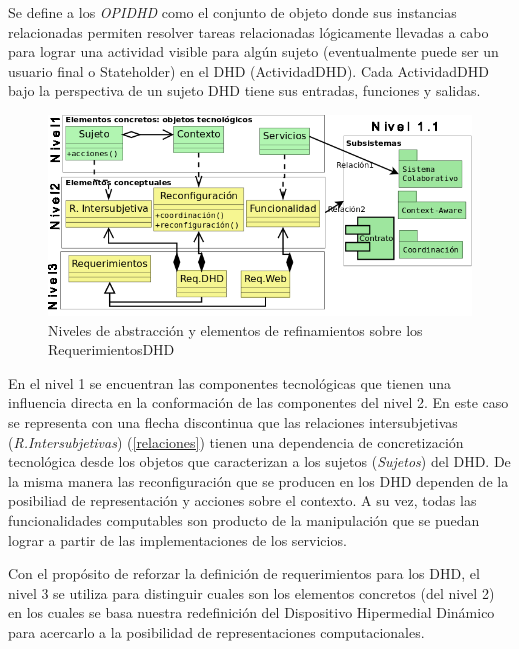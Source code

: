\begin{descrition}
\begin{definition}
\begin{defi} [OPIDHD] Se define a los \textit{OPIDHD} como el conjunto de objeto
donde sus instancias relacionadas permiten resolver tareas relacionadas
lógicamente llevadas a cabo para lograr una actividad visible para algún sujeto
(eventualmente puede ser un usuario final o Stateholder) en el
DHD (ActividadDHD). Cada ActividadDHD bajo la perspectiva de un sujeto DHD tiene
sus entradas, funciones y salidas.
\end{defi} \label{OPIDHD}



\begin{figure}
\begin{center}
 \includegraphics[width=5 in,totalheight=4 in] {DHD/RequerimientosDHD}
   \caption{Niveles de abstracción y elementos de refinamientos sobre
los RequerimientosDHD} \label{fig: RequerimientosDHD}
\end{center}
\end{figure}


En el nivel 1 se encuentran las componentes tecnológicas que tienen una
influencia directa en la conformación de las componentes del nivel 2. En este
caso se representa con una flecha discontinua que las relaciones intersubjetivas
(\textit{R.Intersubjetivas}) (\ref{relaciones}) tienen una  dependencia de
concretización tecnológica desde los objetos que caracterizan a los sujetos
(\textit{Sujetos}) del DHD. De la misma manera las reconfiguración
que se producen en los DHD dependen de la posibiliad de representación y
acciones sobre el contexto. A su vez, todas las funcionalidades computables son
producto de la manipulación que se puedan lograr a partir de las
implementaciones de los servicios.  

Con el propósito de reforzar la definición de requerimientos para los DHD,
el nivel 3 se utiliza para distinguir cuales son los elementos concretos (del
nivel 2) en los cuales se basa nuestra redefinición del Dispositivo Hipermedial
Dinámico para acercarlo a la posibilidad de representaciones computacionales. 


\end{definition}
\end{descrition}
